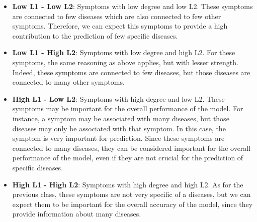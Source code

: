 \begin{itemize}
    \setlength\itemsep{1em}
    \item \textbf{Low L1 - Low L2}: Symptoms with low degree and low L2. These symptoms are connected to few diseases
          which are also connected to few other symptoms. Therefore, we can expect this symptoms to provide a high
          contribution to the prediction of few specific diseases.

    \item \textbf{Low L1 - High L2}: Symptoms with low degree and high L2. For these symptoms, the same reasoning
          as above applies, but with lesser strength. Indeed, these symptoms are connected to few diseases, but those
          diseases are connected to many other symptoms.

    \item \textbf{High L1 - Low L2}: Symptoms with high degree and low L2. These symptoms may be important for the
          overall performance of the model. For instance, a symptom may be associated with many diseases, but those
          diseases may only be associated with that symptom. In this case, the symptom is very important for prediction.
          Since these symptoms are connected to many diseases, they can be considered important for the overall
          performance of the model, even if they are not crucial for the prediction of specific diseases.

    \item \textbf{High L1 - High L2}: Symptoms with high degree and high L2. As for the previous class,
          these symptoms are not very specific of a diseases, but we can expect them to be important for the overall
          accuracy of the model, since they provide information about many diseases.

\end{itemize}

